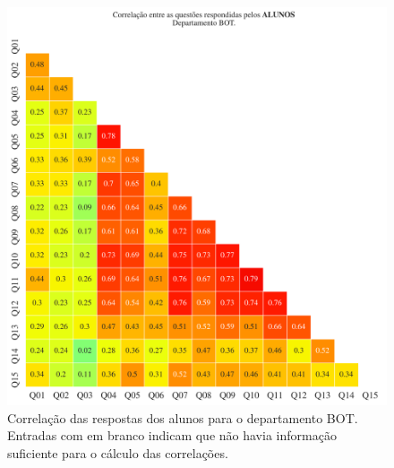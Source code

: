 \documentclass[a4paper,10pt]{article}
\begin{document}
\begin{figure}[h]
\centering
\includegraphics[width=0.999\linewidth]{matriz_corr__BOT_alunos.png}
\caption{\label{fig:corr_alunos}Correlação das respostas dos alunos para o departamento BOT. Entradas com em branco indicam que não havia informação suficiente para o cálculo das correlações.}
\end{figure}
\end{document}
